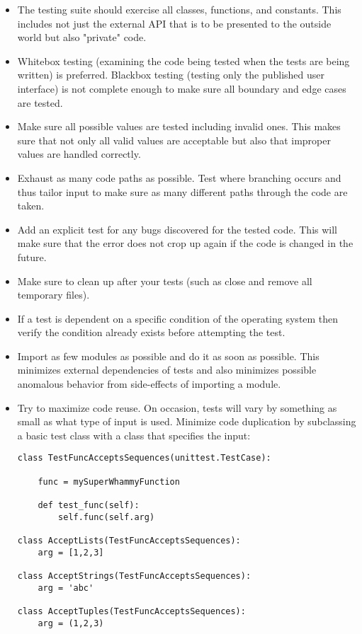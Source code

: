 \begin{itemize}
\item The testing suite should exercise all classes, functions, and
      constants.
      This includes not just the external API that is to be presented to the
      outside world but also "private" code.
\item Whitebox testing (examining the code being tested when the tests are
      being written) is preferred.
      Blackbox testing (testing only the published user interface) is not
      complete enough to make sure all boundary and edge cases are tested.
\item Make sure all possible values are tested including invalid ones.
      This makes sure that not only all valid values are acceptable but also
      that improper values are handled correctly.
\item Exhaust as many code paths as possible.
      Test where branching occurs and thus tailor input to make sure as many
      different paths through the code are taken.
\item Add an explicit test for any bugs discovered for the tested code.
      This will make sure that the error does not crop up again if the code is
      changed in the future.
\item Make sure to clean up after your tests (such as close and remove all
      temporary files).
\item If a test is dependent on a specific condition of the operating system
      then verify the condition already exists before attempting the test.
\item Import as few modules as possible and do it as soon as possible.
      This minimizes external dependencies of tests and also minimizes possible
      anomalous behavior from side-effects of importing a module.
\item Try to maximize code reuse.
      On occasion, tests will vary by something as small as what type
      of input is used.
      Minimize code duplication by subclassing a basic test class with a class
      that specifies the input:
\begin{verbatim}
class TestFuncAcceptsSequences(unittest.TestCase):

    func = mySuperWhammyFunction

    def test_func(self):
        self.func(self.arg)

class AcceptLists(TestFuncAcceptsSequences):
    arg = [1,2,3]

class AcceptStrings(TestFuncAcceptsSequences):
    arg = 'abc'

class AcceptTuples(TestFuncAcceptsSequences):
    arg = (1,2,3)
\end{verbatim}
\end{itemize}

